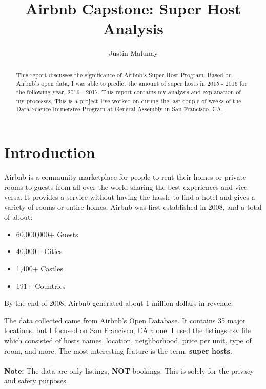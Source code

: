 \documentclass[10pt,letterpapter]{article}
\begin{document}
\title{ \textbf{Airbnb Capstone: Super Host Analysis}}
\author{Justin Malunay}
\maketitle

\begin{abstract}
This report discusses the significance of Airbnb's Super Host Program. Based on Airbnb's open data, I was able to predict the amount of super hosts in 2015 - 2016 for the following year, 2016 - 2017. This report contains my analysis and explanation of my processes. This is a project I've worked on during the last couple of weeks of the Data Science Immersive Program at General Assembly in San Francisco, CA.  
\end{abstract}

\section{Introduction}
\begin{paragraph}
\indent
Airbnb is a community marketplace for people to rent their homes or private rooms to guests from all over the world sharing the best experiences and vice versa. It provides a service without having the hassle to find a hotel and gives a variety of rooms or entire homes. Airbnb was first established in 2008, and a total of about:
\begin{itemize}
	\item 60,000,000+ Guests
	\item 40,000+ Cities
	\item 1,400+ Castles
	\item 191+ Countries
\end{itemize}
\end{paragraph}
\indent
By the end of 2008, Airbnb generated about 1 million dollars in revenue. 

\begin{paragraph}
\indent 
The data collected came from Airbnb's Open Database. It contains 35 major locations, but I focused on San Francisco, CA alone. I used the listings csv file which consisted of hosts names, location, neighborhood, price per unit, type of room, and more. The most interesting feature is the term,  \textbf{super hosts}. 
\\ \\
\textbf{Note:} The data are only listings,  \textbf{NOT} bookings. This is solely for the privacy and safety purposes. 
\end{paragraph}
\end{document}
